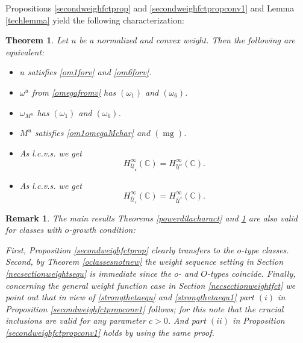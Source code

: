 \documentclass[10pt]{amsart}%
\numberwithin{equation}{section}
\theoremstyle{plain}
\newtheorem{theorem}[proposition]{Theorem}
\newtheorem{remark}[proposition]{Remark}
\newcommand{\CC}{\mathbb{C}}
\let\on=\operatorname
\begin{document}
Propositions \ref{secondweighfctprop} and \ref{secondweighfctpropconv1} and Lemma \ref{techlemma} yield the following characterization:

\begin{theorem}\label{powerdilacharactforweights}
Let $u$ be a normalized and convex weight. Then the following are equivalent:
\begin{itemize}
\item[$(i)$] $u$ satisfies \eqref{om1forv} and \eqref{om6forv}.

\item[$(ii)$]  $\omega^u$ from \eqref{omegafromv} has \hyperlink{om1}{$(\omega_1)$} and \hyperlink{om6}{$(\omega_6)$}.

\item[$(iii)$] $\omega_{M^u}$ has \hyperlink{om1}{$(\omega_1)$} and \hyperlink{om6}{$(\omega_6)$}.

\item[$(iv)$] $M^u$ satisfies \eqref{om1omegaMchar} and \hyperlink{mg}{$(\on{mg})$}.

\item[$(v)$] As l.c.v.s. we get
$$H^{\infty}_{\underline{\mathcal{U}}_{\mathfrak{c}}}(\CC)=H^{\infty}_{\underline{\mathcal{U}}^{\mathfrak{c}}}(\CC).$$

\item[$(vi)$] As l.c.v.s. we get $$H^{\infty}_{\overline{\mathcal{U}}_{\mathfrak{c}}}(\CC)=H^{\infty}_{\overline{\mathcal{U}}^{\mathfrak{c}}}(\CC).$$
\end{itemize}
\end{theorem}

\begin{remark}
\emph{The main results Theorems \ref{powerdilacharact} and \ref{powerdilacharactforweights} are also valid for classes with $o$-growth condition:}

\emph{First, Proposition \ref{secondweighfctprop} clearly transfers to the $o$-type classes. Second, by Theorem \ref{oclassesnotnew} the weight sequence setting in Section \ref{necsectionweightsequ} is immediate since the $o$- and $O$-types coincide. Finally, concerning the general weight function case in Section \ref{necsectionweightfct} we point out that in view of \eqref{strongthetaequ} and \eqref{strongthetaequ1} part $(i)$ in Proposition \ref{secondweighfctpropconv1} follows; for this note that the crucial inclusions are valid for any parameter $c>0$. And part $(ii)$ in Proposition \ref{secondweighfctpropconv1} holds by using the same proof.}
\end{remark}
\end{document}
